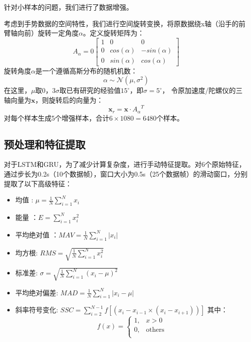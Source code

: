 针对小样本的问题，我们进行了数据增强。

考虑到手势数据的空间特性，我们进行空间旋转变换，将原数据绕x轴（沿手的前臂轴向前）旋转一定角度$\alpha$。定义旋转矩阵为：
$$
A_{\alpha} = 0
\begin{bmatrix}
  1 & 0 & 0\\
  0 & cos(\alpha) & -sin(\alpha)\\
  0& sin(\alpha) & cos(\alpha)
\end{bmatrix}
$$
旋转角度$\alpha$是一个遵循高斯分布的随机机数：
$$
\alpha \sim \mathcal{N}(\mu, \sigma^2)
$$
在这里，$\mu$取0，$3\sigma$取已有研究的经验值$15^\circ$\cites{d2020transformer}，即$\sigma=5^\circ$，
令原加速度/陀螺仪的三轴向量为$\bm{x}$，则旋转后的向量为：
$$
\bm{x}_r = \bm{x} \cdot {A_{\alpha}}^T
$$
对每个样本生成5个增强样本，合计$6 \times 1080 = 6480$个样本。

\subsection{预处理和特征提取}\label{ssec:feature_ext}


对于LSTM和GRU，为了减少计算复杂度，进行手动特征提取。对6个原始特征，通过步长为0.2s（10个数据帧），窗口大小为0.5s（25个数据帧）的滑动窗口，分别提取了以下高级特征：
\begin{itemize}
    \item 均值 : $\mu = \frac{1}{N}\sum_{i=1}^{N}x_i$
    \item 能量 ：$E = \sum_{i=1}^{N}x_i^2$
    \item 平均绝对值 ：$MAV = \frac{1}{N}\sum_{i=1}^{N}|x_i|$
    \item 均方根: $RMS = \sqrt{\frac{1}{N}\sum_{i=1}^{N}x_i^2}$
    \item 标准差: $\sigma =\sqrt{\frac{1}{N}\sum_{i=1}^{N}(x_i-\mu)^2}$
    \item 平均绝对偏差: $MAD=\frac{1}{N}\sum_{i=1}^{N}|x_i-\mu|$
    \item 斜率符号变化: $SSC = \sum_{i=2}^{N-1}f[(x_i-x_{i-1}\times (x_i-x_{i+1}))]$
    其中：
$$f(x) = 
\begin{cases} 
1,  & x > 0 \\
0,  & \text{others}\\
\end{cases}
$$
\end{itemize}

